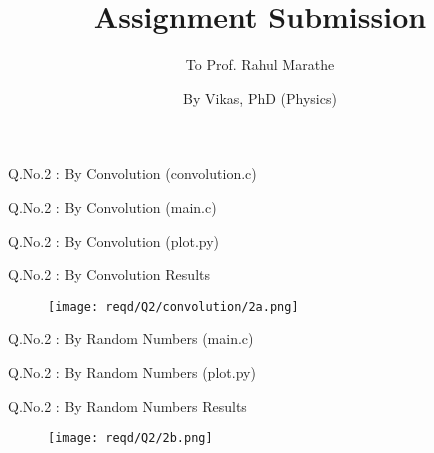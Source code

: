 \documentclass{beamer}
\subtitle{To Prof. Rahul Marathe}
\title[To Prof. Rahul Marathe, Department of Physics]{Assignment Submission}
\author{By Vikas, PhD (Physics) }
\institute{\large \bfseries Indian Institute of Technology, Delhi}
\date{}
\begin{document}
\begin{frame}
	\titlepage
\end{frame}


\begin{frame}{Q.No.2 : By Convolution (convolution.c)}
	
\end{frame}


\begin{frame}{Q.No.2 : By Convolution (main.c)}
	
\end{frame}


\begin{frame}{Q.No.2 : By Convolution (plot.py)}
	
\end{frame}


\begin{frame}{Q.No.2 : By Convolution Results}
	\begin{figure}
		\centering
		\texttt{[image: reqd/Q2/convolution/2a.png]}
	\end{figure}
\end{frame}


\begin{frame}{Q.No.2 : By Random Numbers (main.c)}
	
\end{frame}


\begin{frame}{Q.No.2 : By Random Numbers (plot.py)}
	
\end{frame}


\begin{frame}{Q.No.2 : By Random Numbers Results}
	\begin{figure}
		\centering
		\texttt{[image: reqd/Q2/2b.png]}
	\end{figure}
\end{frame}
\end{document}
